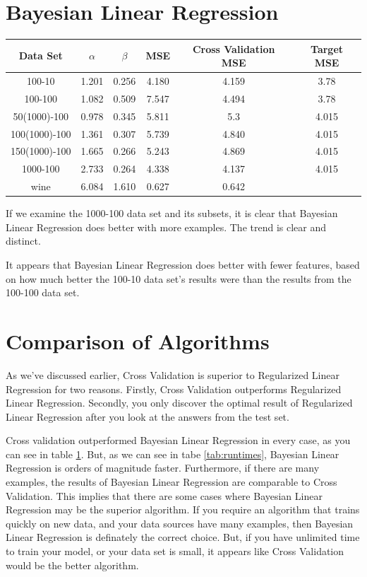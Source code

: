 \documentclass[12pt]{article}
\begin{document}
\section{Bayesian Linear Regression}
\begin{table}[h]
\begin{tabular}{c|c|c|c||c|c}
Data Set & $\alpha$ & $\beta$ & MSE & Cross Validation MSE & Target MSE\\
\hline
100-10 & 1.201 & 0.256 & 4.180 & 4.159 & 3.78\\
100-100 & 1.082 & 0.509 & 7.547 & 4.494 & 3.78\\
50(1000)-100 & 0.978 & 0.345 & 5.811 & 5.3 & 4.015\\
100(1000)-100 & 1.361 & 0.307 & 5.739 & 4.840 & 4.015\\
150(1000)-100 & 1.665 & 0.266 & 5.243 & 4.869 & 4.015\\
1000-100 & 2.733 & 0.264 & 4.338 & 4.137 & 4.015 \\
wine & 6.084 & 1.610 & 0.627 & 0.642 & \\
\end{tabular}
\label{tab:4}
\end{table}

If we examine the 1000-100 data set and its subsets, it is clear that Bayesian Linear Regression does better with more examples.  The trend is clear and distinct.

It appears that Bayesian Linear Regression does better with fewer features, based on how much better the 100-10 data set's results were than the results from the 100-100 data set.

\section{Comparison of Algorithms}

As we've discussed earlier, Cross Validation is superior to Regularized Linear Regression for two reasons.  Firstly, Cross Validation outperforms Regularized Linear Regression.  Secondly, you only discover the optimal result of Regularized Linear Regression after you look at the answers from the test set.

Cross validation outperformed Bayesian Linear Regression in every case, as you can see in table \ref{tab:4}.  But, as we can see in tabe \ref{tab:runtimes}, Bayesian Linear Regression is orders of magnitude faster.  Furthermore, if there are many examples, the results of Bayesian Linear Regression are comparable to Cross Validation.  This implies that there are some cases where Bayesian Linear Regression may be the superior algorithm.  If you require an algorithm that trains quickly on new data, and your data sources have many examples, then Bayesian Linear Regression is definately the correct choice.  But, if you have unlimited time to train your model, or your data set is small, it appears like Cross Validation would be the better algorithm.
\end{document}
